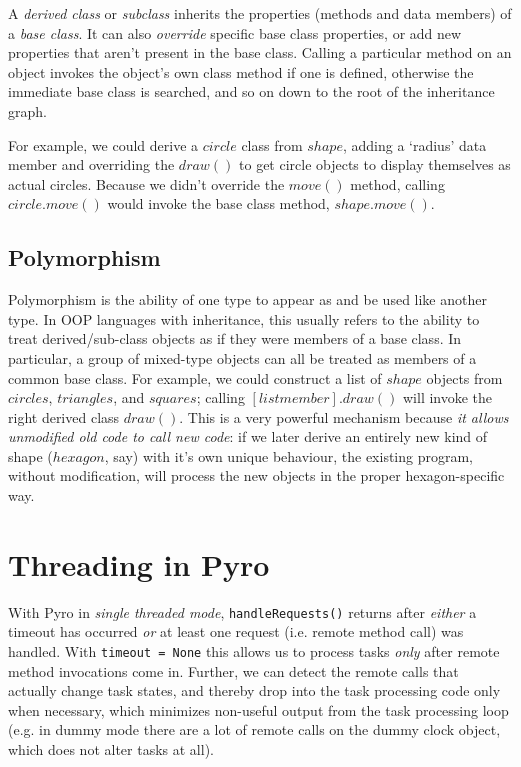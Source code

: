 \documentclass[11pt,a4paper]{article}
\begin{document}
A {\em derived class} or {\em subclass} inherits the properties (methods
and data members) of a {\em base class}. It can also {\em override}
specific base class properties, or add new properties that aren't
present in the base class. Calling a particular method on an object
invokes the object's own class method if one is defined, otherwise the
immediate base class is searched, and so on down to the root of the
inheritance graph. 

For example, we could derive a $circle$ class from $shape$, adding a
`radius' data member and overriding the $draw()$ to get circle objects
to display themselves as actual circles.  Because we didn't override the
$move()$ method, calling $circle.move()$ would invoke the base class
method, $shape.move()$. 


\subsection{Polymorphism}

Polymorphism is the ability of one type to appear as and be used like
another type.  In OOP languages with inheritance, this usually refers to
the ability to treat derived/sub-class objects as if they were members
of a base class.  In particular, a group of mixed-type objects can all
be treated as members of a common base class. For example, we could
construct a list of $shape$ objects from $circles$, $triangles$, and
$squares$; calling $[list member].draw()$ will invoke the right derived
class $draw()$. This is a very powerful mechanism because {\em it allows
unmodified old code to call new code}: if we later derive an entirely
new kind of shape ($hexagon$, say) with it's own unique behaviour, the
existing program, without modification, will process the new objects in
the proper hexagon-specific way.


\section{Threading in Pyro} \label{pyro-appendix}

With Pyro in {\em single threaded mode}, \verb#handleRequests()# returns
after {\em either} a timeout has occurred {\em or} at least one request
(i.e.  remote method call) was handled. With \verb#timeout = None# this
allows us to process tasks {\em only} after remote method invocations
come in.  Further, we can detect the remote calls that actually change
task states, and thereby drop into the task processing code only when
necessary, which minimizes non-useful output from the task processing
loop (e.g. in dummy mode there are a lot of remote calls on the dummy
clock object, which does not alter tasks at all). 
\end{document}
